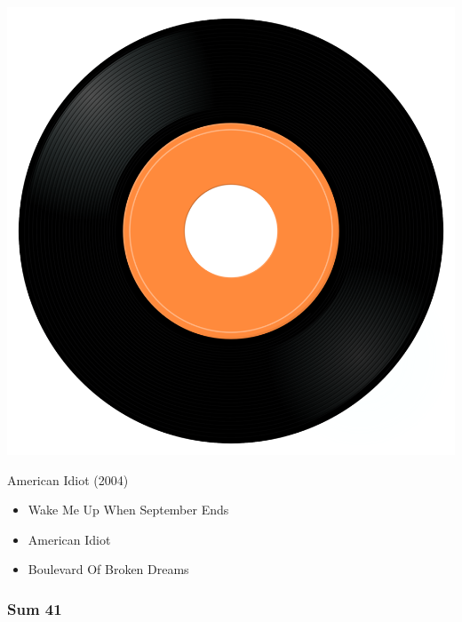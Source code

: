\begin{minipage}[t]{0.25\textwidth}
\captionsetup{type=figure}
\includegraphics[width=\textwidth]{Images/cover.png}
\caption*{American Idiot (2004)}
\end{minipage}
\begin{minipage}[t]{0.25\textwidth}\vspace{0pt}
\begin{itemize}[nosep,leftmargin=1em,labelwidth=*,align=left]
	\setlength{\itemsep}{0pt}
	\item Wake Me Up When September Ends
	\item American Idiot
	\item Boulevard Of Broken Dreams
\end{itemize}
\end{minipage}

\subsubsection{Sum 41}

